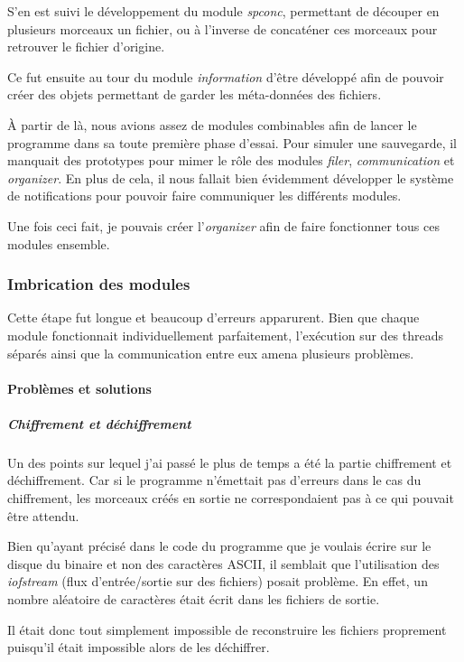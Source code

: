 \documentclass[a4paper,10pt, twoside]{report}
\begin{document}
\begin{spacing}{1.2}
S'en est suivi le développement du module \textit{spconc}, permettant 
de découper en plusieurs morceaux un fichier, ou à l'inverse de
concaténer ces morceaux pour retrouver le fichier d'origine.

Ce fut ensuite au tour du module \textit{information} d'être
développé afin de pouvoir créer des objets permettant de garder les
méta-données des fichiers.

À partir de là, nous avions assez de modules combinables afin de lancer le
programme dans sa toute première phase d'essai. Pour simuler une sauvegarde,
il manquait des prototypes pour mimer le rôle des modules \textit{filer},
\textit{communication} et \textit{organizer}. En plus de cela, il nous fallait
bien évidemment développer le système de notifications pour pouvoir faire
communiquer les différents modules.

Une fois ceci fait, je pouvais créer l'\textit{organizer} afin de faire
fonctionner tous ces modules ensemble.

\subsubsection{Imbrication des modules}

Cette étape fut longue et beaucoup d'erreurs apparurent. Bien que chaque
module fonctionnait individuellement parfaitement, l'exécution sur des 
threads séparés ainsi que la communication entre eux amena plusieurs
problèmes.

\paragraph{Problèmes et solutions}

\subparagraph{Chiffrement et déchiffrement}

\bigskip

Un des points sur lequel j'ai passé le plus de temps a été la partie
chiffrement et déchiffrement. Car si le programme n'émettait pas d'erreurs
dans le cas du chiffrement, les morceaux créés en sortie ne correspondaient
pas à ce qui pouvait être attendu.

Bien qu'ayant précisé dans le code du programme que je voulais écrire
sur le disque du binaire et non des caractères ASCII, il semblait que
l'utilisation des \textit{iofstream} (flux d'entrée/sortie sur des fichiers)
posait problème. En effet, un nombre aléatoire de caractères était
écrit dans les fichiers de sortie. 

Il était donc tout simplement impossible de reconstruire les
fichiers proprement puisqu'il était impossible alors de les déchiffrer.


\end{spacing}
\end{document}
